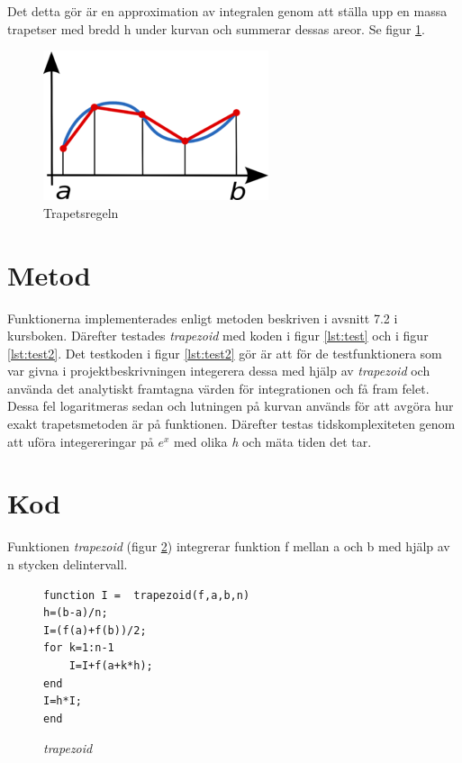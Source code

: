\documentclass[titlepage, a4paper]{article}
\begin{document}
Det detta gör är en approximation av integralen genom att ställa upp en massa trapetser med bredd h under kurvan och summerar dessas areor. Se figur \ref{fig:trapets}.

\begin{figure}[H]
  \centering
  \includegraphics[scale=5.0]{trapets.png}
  \caption{Trapetsregeln}
  \label{fig:trapets}
\end{figure}

\section{Metod}\label{sec:metod}
Funktionerna implementerades enligt metoden beskriven i avsnitt 7.2 i kursboken. Därefter testades \textit{trapezoid} med koden i figur \ref{lst:test} och i figur \ref{lst:test2}. Det testkoden i figur \ref{lst:test2} gör är att för de testfunktionera som var givna i projektbeskrivningen integerera dessa med hjälp av \textit{trapezoid} och använda det analytiskt framtagna värden för integrationen och få fram felet. Dessa fel logaritmeras sedan och lutningen på kurvan används för att avgöra hur exakt trapetsmetoden är på funktionen.
\newline
\newline
Därefter testas tidskomplexiteten genom att uföra integereringar på $e^x$ med olika \textit{h} och mäta tiden det tar.

\section{Kod}
Funktionen \textit{trapezoid} (figur \ref{lst:trapezoid}) integrerar funktion f mellan a och b med hjälp av n stycken delintervall.

\begin{figure}[H]
  \begin{lstlisting}
function I =  trapezoid(f,a,b,n)
h=(b-a)/n;
I=(f(a)+f(b))/2;
for k=1:n-1
    I=I+f(a+k*h);
end
I=h*I;
end
  \end{lstlisting}
  \caption{\textit{trapezoid}}
  \label{lst:trapezoid}
\end{figure}
\end{document}

